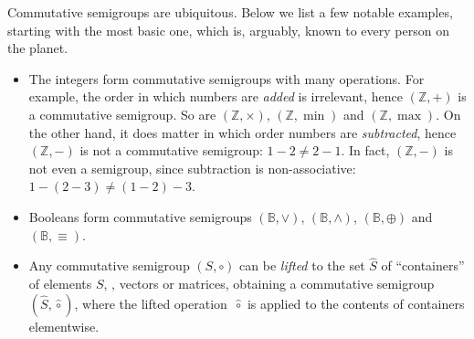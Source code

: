 \documentclass{toc}
\begin{document}
Commutative semigroups are ubiquitous. Below we list a few
notable examples, starting with the most basic one, %
which is, arguably, known to every person on the planet.  %

\begin{itemize}
\item %
    The integers  %
    form commutative semigroups with many operations. For
    example, the order in which numbers are \emph{added} is irrelevant, hence
    $(\mathbb{Z}, +)$ is a commutative semigroup. So are $(\mathbb{Z}, \times)$,
    $(\mathbb{Z}, \min)$ and $(\mathbb{Z}, \max)$.
    On the other hand, it does
    matter in which order numbers are \emph{subtracted}, hence $(\mathbb{Z}, -)$
    is not a commutative semigroup: $1-2 \neq 2-1$. In fact, $(\mathbb{Z}, -)$
    is not even a semigroup, since subtraction is non-associative:
    $1-(2-3) \neq (1-2)-3$.   %

    \item Booleans form commutative semigroups $(\mathbb{B}, \vee)$,
    $(\mathbb{B}, \wedge)$, $(\mathbb{B}, \oplus)$ and $(\mathbb{B}, \equiv)$.
      
    \item Any commutative semigroup $(S, \circ)$ can be \emph{lifted} to the set
      $\hat{S}$ of ``containers'' %
      of elements $S$, \eg, vectors or matrices,
    obtaining a commutative semigroup $(\hat{S}, \hat{\circ})$, where the lifted
    operation~$\hat{\circ}$ is applied to the contents of containers
    elementwise.  %
    

\end{itemize}
\end{document}
